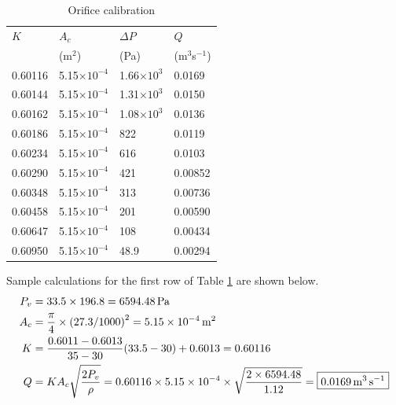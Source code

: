 \begin{table}[h]
    \centering
    \caption{Orifice calibration}
    \label{tab:orifice_calibration}
    \begin{tabular}{p{2cm}p{2cm}p{2cm}p{2cm}}
        \toprule
        $K$ & $A_c$ & $\Delta P$ & $Q$ \\ 
        & (m$^2$) & (Pa) & (m$^3$s$^{-1}$) \\
        \midrule
        0.60116 & 5.15$\times 10^{-4}$ & 1.66$\times 10^3$ & 0.0169 \\
        0.60144 & 5.15$\times 10^{-4}$ & 1.31$\times 10^3$ & 0.0150 \\
        0.60162 & 5.15$\times 10^{-4}$ & 1.08$\times 10^3$ & 0.0136 \\
        0.60186 & 5.15$\times 10^{-4}$ & 822 & 0.0119 \\
        0.60234 & 5.15$\times 10^{-4}$ & 616 & 0.0103 \\
        0.60290 & 5.15$\times 10^{-4}$ & 421 & 0.00852 \\
        0.60348 & 5.15$\times 10^{-4}$ & 313 & 0.00736 \\
        0.60458 & 5.15$\times 10^{-4}$ & 201 & 0.00590 \\
        0.60647 & 5.15$\times 10^{-4}$ & 108 & 0.00434 \\
        0.60950 & 5.15$\times 10^{-4}$ & 48.9 & 0.00294 \\
        \bottomrule
    \end{tabular}
\end{table}

Sample calculations for the first row of Table \ref{tab:orifice_calibration} are shown below.
\begin{align*}
    P_v &= 33.5 \times 196.8 = \qty{6594.48}{\pascal} \\
    A_c &= \frac{\pi}{4} \times \left(27.3/1000\right)^2 = \qty{5.15E-4}{\meter\squared} \\
    K &= \frac{0.6011 - 0.6013}{35-30}(33.5 - 30) + 0.6013 = 0.60116 \\
    Q &= K A_c \sqrt{\frac{2 P_v}{\rho}} = 0.60116 \times 5.15 \times 10^{-4} \times \sqrt{\frac{2 \times 6594.48}{1.12}} 
    = \boxed{\qty{0.0169}{\meter\cubed\per\second}}
\end{align*}
\section{}
\FloatBarrier

